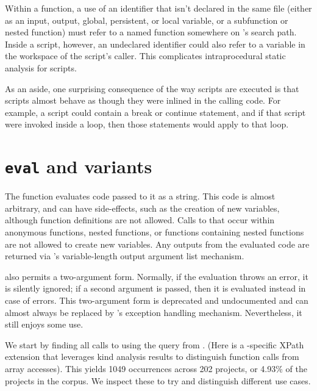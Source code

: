 Within a function, a use of an identifier that isn't declared in the same file
(either as an input, output, global, persistent, or local variable, or a
subfunction or nested function) must refer to a named function somewhere on
\matlab's search path. Inside a script, however, an undeclared identifier could
also refer to a variable in the workspace of the script's caller. This
complicates intraprocedural static analysis for scripts.

As an aside, one surprising consequence of the way scripts are executed is that
scripts almost behave as though they were inlined in the calling code. For
example, a script could contain a break or continue statement, and if that
script were invoked inside a loop, then those statements would apply to that
loop.


\section{\texttt{eval} and variants} \label{sec:Eval}

The  function evaluates \matlab code passed to it as a string. This
code is almost arbitrary, and can have side-effects, such as the creation of
new variables, although function definitions are not allowed. Calls to
 that occur within anonymous functions, nested functions, or
functions containing nested functions are not allowed to create new variables.
Any outputs from the evaluated code are returned via \matlab's variable-length
output argument list mechanism.

 also permits a two-argument form. Normally, if the evaluation
throws an error, it is silently ignored; if a second argument is passed, then
it is evaluated instead in case of errors. This two-argument form is deprecated
and undocumented and can almost always be replaced by \matlab's  exception handling mechanism. Nevertheless, it still enjoys some use.

We start by finding all calls to  using the query from
. (Here  is a \mcbench-specific XPath
extension that leverages kind analysis results to distinguish function calls
from array accesses). This yields 1049 occurrences across 202 projects, or
4.93\% of the projects in the corpus. We inspect these to try and distinguish
different use cases.

